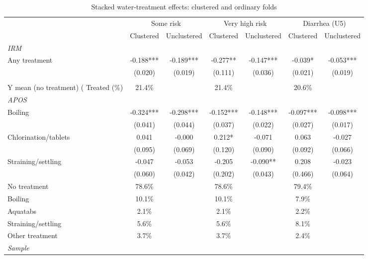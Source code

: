 \begin{table}[htbp]
\centering
\caption{Stacked water-treatment effects: clustered and ordinary folds}
\label{tab:water-treatment-appendix}
\scriptsize
\setlength{\tabcolsep}{4pt}
\renewcommand{\arraystretch}{0.92}
\begin{adjustbox}{max width=\linewidth}
\begin{tabular}{lcccccc}
\hline\hline
 & \multicolumn{2}{c}{Some risk} & \multicolumn{2}{c}{Very high risk} & \multicolumn{2}{c}{Diarrhea (U5)} \\
 & Clustered & Unclustered & Clustered & Unclustered & Clustered & Unclustered \\
\hline
\multicolumn{7}{l}{\textit{IRM}} \\
Any treatment & -0.188*** & -0.189*** & -0.277** & -0.147*** & -0.039* & -0.053*** \\
 & (0.020) & (0.019) & (0.111) & (0.036) & (0.021) & (0.019) \\
\addlinespace[6pt]
\multicolumn{7}{l}{\textit{Shares}} \\
Y mean (no treatment) (%
Treated (\%) & 21.4\% &  & 21.4\% &  & 20.6\% &  \\
\midrule
\multicolumn{7}{l}{\textit{APOS}} \\
Boiling & -0.324*** & -0.298*** & -0.152*** & -0.148*** & -0.097*** & -0.098*** \\
 & (0.041) & (0.044) & (0.037) & (0.022) & (0.027) & (0.017) \\
Chlorination/tablets & 0.041 & -0.000 & 0.212* & -0.071 & 0.063 & -0.027 \\
 & (0.095) & (0.069) & (0.120) & (0.090) & (0.092) & (0.066) \\
Straining/settling & -0.047 & -0.053 & -0.205 & -0.090** & 0.208 & -0.023 \\
 & (0.060) & (0.042) & (0.202) & (0.043) & (0.466) & (0.064) \\
\addlinespace[6pt]
No treatment & 78.6\% &  & 78.6\% &  & 79.4\% &  \\
Boiling & 10.1\% &  & 10.1\% &  & 7.9\% &  \\
Aquatabs & 2.1\% &  & 2.1\% &  & 2.2\% &  \\
Straining/settling & 5.6\% &  & 5.6\% &  & 8.1\% &  \\
Other treatment & 3.7\% &  & 3.7\% &  & 2.4\% &  \\
\midrule
\multicolumn{7}{l}{\textit{Sample}} \\

\end{tabular}
\end{adjustbox}
\end{table}
